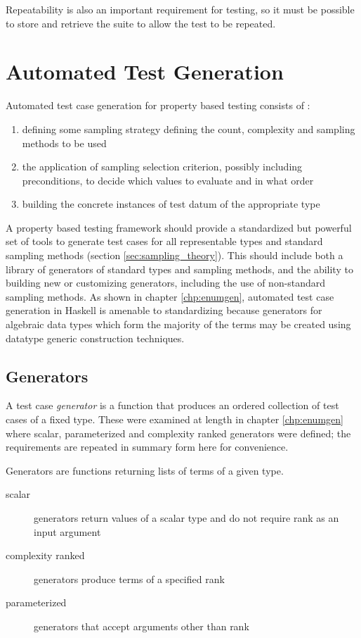 Repeatability is also an important requirement for testing,
so it must be possible to store and retrieve the suite to allow the test to be repeated.


\section{Automated Test Generation} \label{reqtestgen}

Automated test case generation for property based testing consists of :

\begin{enumerate}
	\item defining some sampling strategy defining the count, complexity and sampling methods to be used
	\item the application of sampling selection criterion, possibly including preconditions, to decide which values to evaluate and in what order
	\item building the concrete instances of test datum of the appropriate type
\end{enumerate}

A property based testing framework should provide a
standardized but powerful set of tools to generate test cases
for all representable types and standard sampling methods (section \ref{sec:sampling_theory}).
This should include both a library of generators of standard types and sampling methods,
and the ability to building new or customizing generators,
including the use of non-standard sampling methods.
As shown in chapter \ref{chp:enumgen}, 
automated test case generation in Haskell is amenable to standardizing
because generators for algebraic data types which form the majority of the terms
may be created using datatype generic construction techniques.

\subsection{Generators}

A test case \emph{generator} is a function that produces an ordered collection of test cases of a fixed type.
These were examined at length in chapter \ref{chp:enumgen}
where scalar, parameterized and complexity ranked generators were defined;
the requirements are repeated in summary form here for convenience.

Generators are functions returning lists of terms of a given type.
\begin{description}
	\item[scalar] generators return values of a scalar type and do not require rank as an input argument
	\item[complexity ranked] generators produce terms of a specified rank
	\item[parameterized] generators that accept arguments other than rank
\end{description}

